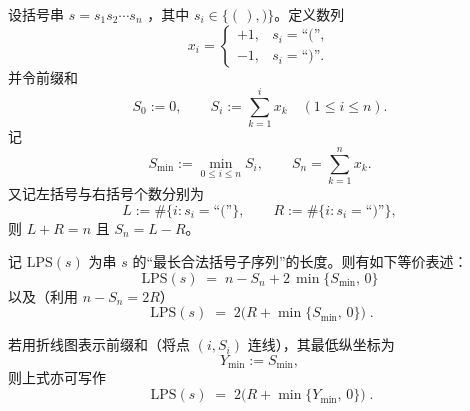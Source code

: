 设括号串 \(s=s_1s_2\cdots s_n\) ，其中 \(s_i\in\{(\,),)\}\)。定义数列
\[
x_i=\begin{cases}
+1,& s_i=\text{“(”},\\
-1,& s_i=\text{“)”}.
\end{cases}
\]
并令前缀和
\[
S_0:=0,\qquad S_i:=\sum_{k=1}^{i}x_k\quad(1\le i\le n).
\]
记
\[
S_{\min}:=\min_{0\le i\le n}S_i,\qquad S_n=\sum_{k=1}^{n}x_k.
\]
又记左括号与右括号个数分别为
\[
L:=\#\{i:s_i=\text{“(”}\},\qquad R:=\#\{i:s_i=\text{“)”}\},
\]
则 \(L+R=n\) 且 \(S_n=L-R\)。

记 \(\mathrm{LPS}(s)\) 为串 \(s\) 的“最长合法括号子序列”的长度。则有如下等价表述：
\[
\boxed{\;\mathrm{LPS}(s)\;=\;n-S_n+2\,\min\{S_{\min},\,0\}\;}
\]
以及（利用 \(n-S_n=2R\)）
\[
\boxed{\;\mathrm{LPS}(s)\;=\;2\Big(R+\min\{S_{\min},\,0\}\Big)\;.}
\]

若用折线图表示前缀和（将点 \((i,S_i)\) 连线），其最低纵坐标为
\[
Y_{\min}:=S_{\min},
\]
则上式亦可写作
\[
\boxed{\;\mathrm{LPS}(s)\;=\;2\Big(R+\min\{Y_{\min},\,0\}\Big)\;.}
\]
